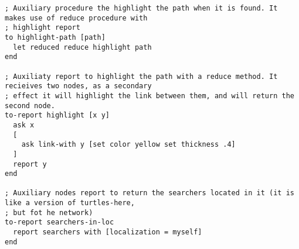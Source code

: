 \begin{lstlisting}
; Auxiliary procedure the highlight the path when it is found. It makes use of reduce procedure with
; highlight report
to highlight-path [path]
  let reduced reduce highlight path
end

; Auxiliaty report to highlight the path with a reduce method. It recieives two nodes, as a secondary
; effect it will highlight the link between them, and will return the second node.
to-report highlight [x y]
  ask x
  [
    ask link-with y [set color yellow set thickness .4]
  ]
  report y
end

; Auxiliary nodes report to return the searchers located in it (it is like a version of turtles-here,
; but fot he network)
to-report searchers-in-loc
  report searchers with [localization = myself]
end
\end{lstlisting}
